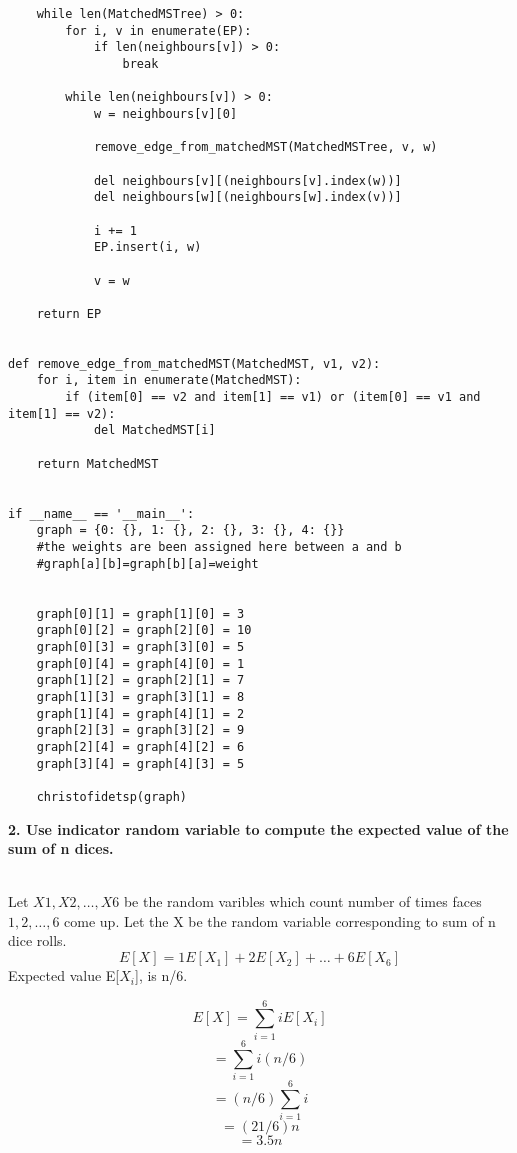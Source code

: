 \documentclass[12pt, letterpaper, twoside]{book}
\begin{document}
\begin{lstlisting}
    while len(MatchedMSTree) > 0:
        for i, v in enumerate(EP):
            if len(neighbours[v]) > 0:
                break

        while len(neighbours[v]) > 0:
            w = neighbours[v][0]

            remove_edge_from_matchedMST(MatchedMSTree, v, w)

            del neighbours[v][(neighbours[v].index(w))]
            del neighbours[w][(neighbours[w].index(v))]

            i += 1
            EP.insert(i, w)

            v = w

    return EP


def remove_edge_from_matchedMST(MatchedMST, v1, v2):
    for i, item in enumerate(MatchedMST):
        if (item[0] == v2 and item[1] == v1) or (item[0] == v1 and item[1] == v2):
            del MatchedMST[i]

    return MatchedMST


if __name__ == '__main__':
    graph = {0: {}, 1: {}, 2: {}, 3: {}, 4: {}}
    #the weights are been assigned here between a and b
    #graph[a][b]=graph[b][a]=weight
    
    
    graph[0][1] = graph[1][0] = 3
    graph[0][2] = graph[2][0] = 10
    graph[0][3] = graph[3][0] = 5
    graph[0][4] = graph[4][0] = 1
    graph[1][2] = graph[2][1] = 7
    graph[1][3] = graph[3][1] = 8
    graph[1][4] = graph[4][1] = 2
    graph[2][3] = graph[3][2] = 9
    graph[2][4] = graph[4][2] = 6
    graph[3][4] = graph[4][3] = 5

    christofidetsp(graph)
\end{lstlisting}

\begin{large}
\textbf{2. Use indicator random variable to compute the expected value of the sum of n dices.}
\end{large}\\
Let $X1, X2, \dots, X6$ be the random varibles which count number of times faces $1, 2,\dots, 6$ come up. Let the X be the random variable corresponding to sum of n dice rolls. \[E[X] = 1E[X_{1}] + 2E[X_{2}] + \dots +6E[X_{6}]\]
Expected value E[$X_i$], is n/6.

\[E[X] = \sum_{i=1}^{6} iE[X_i]\]
\[=\sum_{i=1}^{6} i(n/6)\]
\[=(n/6)\sum_{i=1}^{6} i\]
\[= (21/6)n\]
\[= 3.5n\]\\
\end{document}
